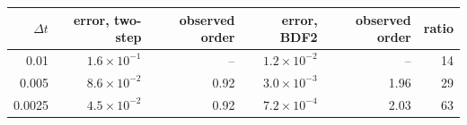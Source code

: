 \begin{tabular}{rrrrrr}
\toprule
$\Delta t$ & error, two-step & observed order & error, BDF2 & observed order & ratio \\
\midrule
0.01 & $1.6\times10^{-1}$ & -- & $1.2\times10^{-2}$ & -- & 14 \\
0.005 & $8.6\times10^{-2}$ & 0.92 & $3.0\times10^{-3}$ & 1.96 & 29 \\
0.0025 & $4.5\times10^{-2}$ & 0.92 & $7.2\times10^{-4}$ & 2.03 & 63 \\
\bottomrule
\end{tabular}
